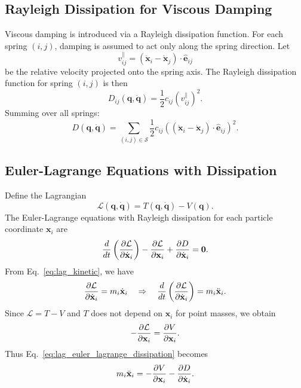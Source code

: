 \documentclass[manuscript,nonacm,12pt,letterpaper]{acmart}
\begin{document}
\subsection{Rayleigh Dissipation for Viscous Damping}
\label{Sec5.4:Damping}

Viscous damping is introduced via a Rayleigh dissipation function. For each spring $(i,j)$, damping is assumed to act only along the spring direction. Let
\begin{equation}
v^{\parallel}_{ij} = (\dot{\mathbf{x}}_i - \dot{\mathbf{x}}_j)\cdot \hat{\mathbf{e}}_{ij}
\label{eq:lag_vrel_parallel}
\end{equation}
be the relative velocity projected onto the spring axis. The Rayleigh dissipation function for spring $(i,j)$ is then
\begin{equation}
D_{ij}(\mathbf{q},\dot{\mathbf{q}})
=
\frac{1}{2} c_{ij} \left( v^{\parallel}_{ij} \right)^2.
\label{eq:lag_rayleigh_one}
\end{equation}
Summing over all springs:
\begin{equation}
D(\mathbf{q},\dot{\mathbf{q}})
=
\sum_{(i,j)\in \mathcal{S}}
\frac{1}{2} c_{ij}
\left(
(\dot{\mathbf{x}}_i - \dot{\mathbf{x}}_j)\cdot \hat{\mathbf{e}}_{ij}
\right)^2.
\label{eq:lag_rayleigh_total}
\end{equation}

\subsection{Euler-Lagrange Equations with Dissipation}
\label{Sec5.5:LagrangeEquations}

Define the Lagrangian
\begin{equation}
\mathcal{L}(\mathbf{q},\dot{\mathbf{q}})
=
T(\mathbf{q},\dot{\mathbf{q}}) - V(\mathbf{q}).
\label{eq:lag_lagrangian_def}
\end{equation}
The Euler-Lagrange equations with Rayleigh dissipation for each particle coordinate $\mathbf{x}_i$ are
\begin{equation}
\frac{d}{dt}\left(\pdv{\mathcal{L}}{\dot{\mathbf{x}}_i}\right)
-
\pdv{\mathcal{L}}{\mathbf{x}_i}
+
\pdv{D}{\dot{\mathbf{x}}_i}
= \mathbf{0}.
\label{eq:lag_euler_lagrange_dissipation}
\end{equation}
From Eq.~\eqref{eq:lag_kinetic}, we have
\[
\pdv{\mathcal{L}}{\dot{\mathbf{x}}_i} = m_i \dot{\mathbf{x}}_i
\quad \Rightarrow \quad
\frac{d}{dt}\left(\pdv{\mathcal{L}}{\dot{\mathbf{x}}_i}\right) = m_i \ddot{\mathbf{x}}_i.
\]
Since $\mathcal{L} = T - V$ and $T$ does not depend on $\mathbf{x}_i$ for point masses, we obtain
\[
-\pdv{\mathcal{L}}{\mathbf{x}_i} = \pdv{V}{\mathbf{x}_i}.
\]
Thus Eq.~\eqref{eq:lag_euler_lagrange_dissipation} becomes
\begin{equation}
m_i \ddot{\mathbf{x}}_i
=
-\pdv{V}{\mathbf{x}_i}
-\pdv{D}{\dot{\mathbf{x}}_i}.
\label{eq:lag_eom_general}
\end{equation}
\end{document}
